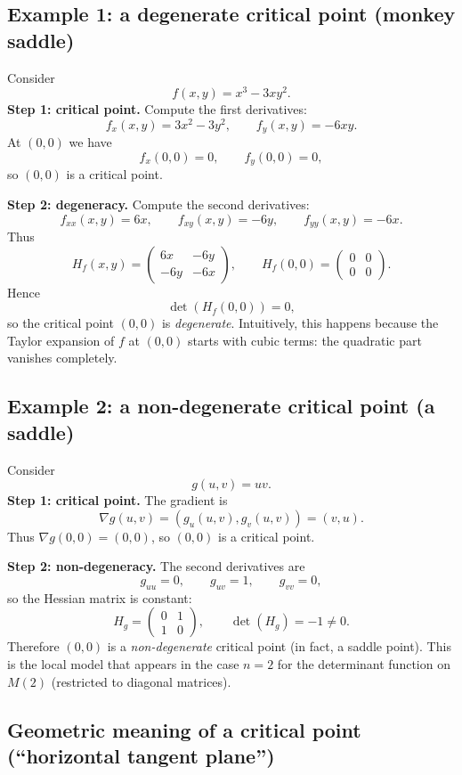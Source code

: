 \documentclass[12pt,a4paper]{article}
\theoremstyle{plain}
\theoremstyle{definition}      %
\begin{document}
	\medskip
	\subsection*{Example 1: a degenerate critical point (monkey saddle)}
	Consider
	\[
	f(x,y)=x^3-3xy^2.
	\]
	\noindent\textbf{Step 1: critical point.}
	Compute the first derivatives:
	\[
	f_x(x,y)=3x^2-3y^2,
	\qquad
	f_y(x,y)=-6xy.
	\]
	At $(0,0)$ we have
	\[
	f_x(0,0)=0,\qquad f_y(0,0)=0,
	\]
	so $(0,0)$ is a critical point.
	
	\smallskip
	\noindent\textbf{Step 2: degeneracy.}
	Compute the second derivatives:
	\[
	f_{xx}(x,y)=6x,\qquad f_{xy}(x,y)=-6y,\qquad f_{yy}(x,y)=-6x.
	\]
	Thus
	\[
	H_f(x,y)=
	\begin{pmatrix}
		6x & -6y\\
		-6y & -6x
	\end{pmatrix},
	\qquad
	H_f(0,0)=
	\begin{pmatrix}
		0 & 0\\
		0 & 0
	\end{pmatrix}.
	\]
	Hence
	\[
	\det(H_f(0,0))=0,
	\]
	so the critical point $(0,0)$ is \emph{degenerate}. Intuitively, this happens because the Taylor expansion of $f$ at
	$(0,0)$ starts with cubic terms: the quadratic part vanishes completely.
	
	\medskip
	\subsection*{Example 2: a non-degenerate critical point (a saddle)}
	Consider
	\[
	g(u,v)=uv.
	\]
	\noindent\textbf{Step 1: critical point.}
	The gradient is
	\[
	\nabla g(u,v)=(g_u(u,v),g_v(u,v))=(v,u).
	\]
	Thus $\nabla g(0,0)=(0,0)$, so $(0,0)$ is a critical point.
	
	\smallskip
	\noindent\textbf{Step 2: non-degeneracy.}
	The second derivatives are
	\[
	g_{uu}=0,\qquad g_{uv}=1,\qquad g_{vv}=0,
	\]
	so the Hessian matrix is constant:
	\[
	H_g=
	\begin{pmatrix}
		0 & 1\\
		1 & 0
	\end{pmatrix},
	\qquad
	\det(H_g)=-1\neq 0.
	\]
	Therefore $(0,0)$ is a \emph{non-degenerate} critical point (in fact, a saddle point). This is the local model
	that appears in the case $n=2$ for the determinant function on $M(2)$ (restricted to diagonal matrices).
	
	\subsection*{Geometric meaning of a critical point (``horizontal tangent plane'')}
	
\end{document}
